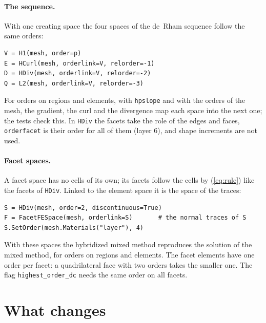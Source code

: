 \documentclass[10pt,a4paper]{article}
\newcommand{\code}[1]{\texttt{#1}}
\begin{document}
\paragraph{The sequence.} With one creating space the four spaces of the de~Rham sequence follow the same orders:
\begin{lstlisting}
V = H1(mesh, order=p)
E = HCurl(mesh, orderlink=V, relorder=-1)
D = HDiv(mesh, orderlink=V, relorder=-2)
Q = L2(mesh, orderlink=V, relorder=-3)
\end{lstlisting}
For orders on regions and elements, with \code{hpslope} and with the orders of the mesh, the gradient, the curl and the divergence map each space into the next one; the tests check this. In \code{HDiv} the facets take the role of the edges and faces, \code{orderfacet} is their order for all of them (layer 6), and shape increments are not used.

\paragraph{Facet spaces.} A facet space has no cells of its own; its facets follow the cells by (\ref{eq:rule}) like the facets of \code{HDiv}. Linked to the element space it is the space of the traces:
\begin{lstlisting}
S = HDiv(mesh, order=2, discontinuous=True)
F = FacetFESpace(mesh, orderlink=S)       # the normal traces of S
S.SetOrder(mesh.Materials("layer"), 4)
\end{lstlisting}
With these spaces the hybridized mixed method reproduces the solution of the mixed method, for orders on regions and elements. The facet elements have one order per facet: a quadrilateral face with two orders takes the smaller one. The flag \code{highest\_order\_dc} needs the same order on all facets.

\section{What changes}
\end{document}

